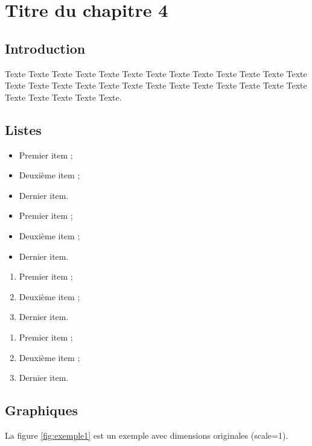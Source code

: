 \chapter{Titre du chapitre 4}

\section{Introduction} 

Texte Texte Texte Texte Texte Texte Texte Texte Texte Texte Texte Texte Texte Texte Texte Texte Texte Texte Texte Texte Texte Texte Texte Texte Texte Texte Texte Texte Texte Texte Texte.

\section{Listes}

\begin{itemize}
	\item Premier item ;
	\item Deuxième item ;
	\item Dernier item.
\end{itemize}

\begin{itemize}[itemsep=0pt]
	\renewcommand{\labelitemi}{\scriptsize$\blacksquare$}
	\item Premier item ;
	\item Deuxième item ;
	\item Dernier item.
\end{itemize}

\begin{enumerate}
	\item Premier item ;
	\item Deuxième item ;
	\item Dernier item.
\end{enumerate}

\begin{enumerate}[label=\alph*)]
	\item Premier item ;
	\item Deuxième item ;
	\item Dernier item.
\end{enumerate}

\section{Graphiques}
La figure \ref{fig:exemple1} est un exemple avec dimensions originales (scale=1).

